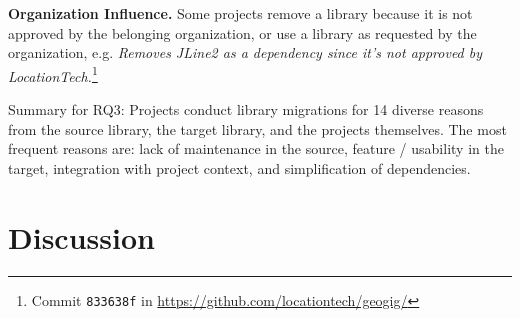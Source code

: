 \documentclass[sigconf, screen]{acmart}
\begin{document}
\textbf{Organization Influence.}
Some projects remove a library because it is not approved by the belonging organization, or use a library as requested by the organization, e.g. \textit{Removes JLine2 as a dependency since it's not approved by LocationTech.}\footnote{Commit \texttt{833638f} in \url{https://github.com/locationtech/geogig/}}

\begin{result-rq}{Summary for RQ3:}
Projects conduct library migrations for 14 diverse reasons from the source library, the target library, and the projects themselves.
The most frequent reasons are: lack of maintenance in the source, feature / usability in the target, integration with project context, and simplification of dependencies.
\end{result-rq}






\section{Discussion}
\end{document}
